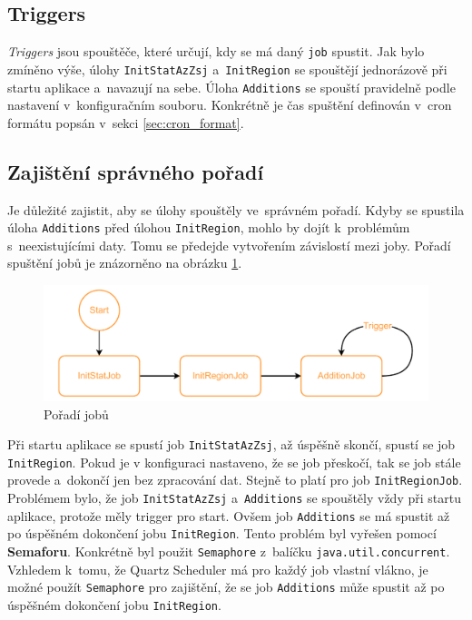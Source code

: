 \subsection{Triggers}
\textit{Triggers} jsou spouštěče, které určují, kdy se má daný \texttt{job} spustit.
Jak bylo zmíněno výše, úlohy \texttt{InitStatAzZsj} a~\texttt{InitRegion} se spouštějí jednorázově při startu aplikace a~navazují na sebe.
Úloha \texttt{Additions} se spouští pravidelně podle nastavení v~konfiguračním souboru.
Konkrétně je čas spuštění definován v~cron formátu popsán v~sekci \ref{sec:cron_format}.

\subsection{Zajištění správného pořadí}
Je důležité zajistit, aby se úlohy spouštěly ve~správném pořadí.
Kdyby se spustila úloha \texttt{Additions} před úlohou \texttt{InitRegion}, 
mohlo by dojít k~problémům s~neexistujícími daty.
Tomu se předejde vytvořením závislostí mezi joby.
Pořadí spuštění jobů je znázorněno na obrázku \ref{fig:jobs_scheduled}.

\begin{figure}[!h]
    \caption{Pořadí jobů}
    \label{fig:jobs_scheduled}
    \centering
    \includegraphics[width=\textwidth]{figures/jobs_scheduled.pdf}
\end{figure}

Při startu aplikace se spustí job \texttt{InitStatAzZsj}, až úspěšně skončí,
spustí se job \texttt{InitRegion}. Pokud je v konfiguraci nastaveno, že se job
přeskočí, tak se job stále provede a~dokončí jen bez zpracování dat.
Stejně to platí pro job \texttt{InitRegionJob}.
Problémem bylo, že job \texttt{InitStatAzZsj} a~\texttt{Additions}
se spouštěly vždy při startu aplikace, protože měly trigger pro start.
Ovšem job \texttt{Additions} se má spustit až po úspěšném dokončení jobu
\texttt{InitRegion}. Tento problém byl vyřešen pomocí \textbf{Semaforu}.
Konkrétně byl použit \texttt{Semaphore} z~balíčku \texttt{java.util.concurrent}.
Vzhledem k~tomu, že Quartz Scheduler má pro každý job vlastní vlákno,
je možné použít \texttt{Semaphore} pro zajištění, že se job \texttt{Additions}
může spustit až po úspěšném dokončení jobu \texttt{InitRegion}.

